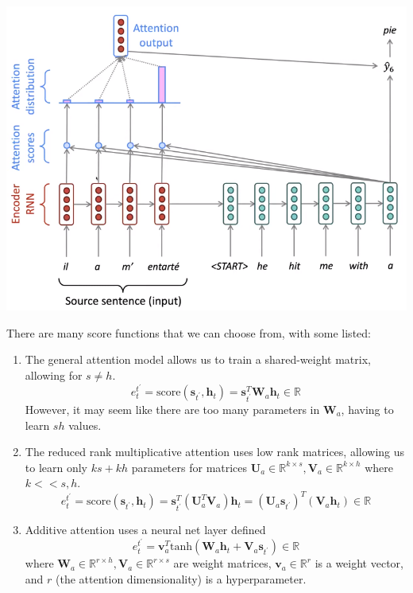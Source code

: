 \documentclass{article}
\theoremstyle{definition}
\theoremstyle{remark}
\theoremstyle{definition}
\begin{document}
\begin{center}
    \includegraphics[scale=0.4]{Images/seq2seq_attention.png}
\end{center}
There are many score functions that we can choose from, with some listed: 
\begin{enumerate}
    \item The general attention model allows us to train a shared-weight matrix, allowing for $s \neq h$. 
    \[e^{t^\prime}_t = \mathrm{score}(\mathbf{s}_{t^\prime}, \mathbf{h}_t) = \mathbf{s}_{t^\prime}^T \mathbf{W}_a \mathbf{h}_t \in \mathbb{R}\]
    However, it may seem like there are too many parameters in $\mathbf{W}_a$, having to learn $sh$ values. 

    \item The reduced rank multiplicative attention uses low rank matrices, allowing us to learn only $ks + kh$ parameters for matrices $\mathbf{U}_a \in \mathbb{R}^{k \times s}, \mathbf{V}_a \in \mathbb{R}^{k \times h}$ where $k << s, h$. 
    \[e^{t^\prime}_t = \mathrm{score}(\mathbf{s}_{t^\prime}, \mathbf{h}_t) = \mathbf{s}_{t^\prime}^T (\mathbf{U}_a^T \mathbf{V}_a) \mathbf{h}_t = (\mathbf{U}_a \mathbf{s}_{t^\prime})^T (\mathbf{V}_a \mathbf{h}_t) \in \mathbb{R}\]

    \item Additive attention uses a neural net layer defined 
    \[e^{t^\prime}_t = \mathbf{v}_a^T \mathrm{tanh}(\mathbf{W}_a \mathbf{h}_t + \mathbf{V}_a \mathbf{s}_{t^\prime}) \in \mathbb{R}\]
    where $\mathbf{W}_a \in \mathbb{R}^{r \times h}, \mathbf{V}_a \in \mathbb{R}^{r \times s}$ are weight matrices, $\mathbf{v}_a \in \mathbb{R}^r$ is a weight vector, and $r$ (the attention dimensionality) is a hyperparameter. 
\end{enumerate}
\end{document}
